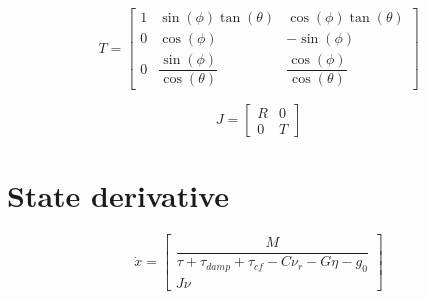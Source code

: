 \documentclass[12pt,a4]{article}
\begin{document}
\begin{equation}
	T =
	\begin{bmatrix}
		1 & \sin(\phi)\tan(\theta)           & \cos(\phi)\tan(\theta)           \\
		0 & \cos(\phi)                       & -\sin(\phi)                      \\
		0 & \dfrac{\sin(\phi)}{\cos(\theta)} & \dfrac{\cos(\phi)}{\cos(\theta)}
	\end{bmatrix}
\end{equation}

\begin{equation}
	J = \begin{bmatrix}
		R & 0 \\
		0 & T
	\end{bmatrix}
\end{equation}

\section{State derivative}
\begin{equation}
	\dot{x} =
	\begin{bmatrix}
		\dfrac{M}{\tau + \tau_{damp} + \tau_{cf} - C  \nu_r - G  \eta - g_0} \\
		J \nu
	\end{bmatrix}
\end{equation}
\end{document}

